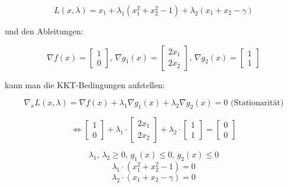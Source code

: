 \documentclass[a4paper, 12pt]{report}
\begin{document}
$$L(x, \lambda) = x_1 + \lambda_1(x_1^2 + x_2^2 - 1) + \lambda_2(x_1 + x_2 - \gamma)$$

und den Ableitungen:

$$\nabla f(x) = \begin{bmatrix}1 \\ 0\end{bmatrix} \text{, } \nabla g_1(x) = \begin{bmatrix}2x_1\\2x_2\end{bmatrix} \text{, } \nabla g_2(x) = \begin{bmatrix}1\\1\end{bmatrix}$$

kann man die KKT-Bedingungen aufstellen:

$$\nabla_x L(x, \lambda) = \nabla f(x) + \lambda_1\nabla g_1(x) + \lambda_2\nabla g_2(x) = 0 \text{ (Stationarität)}$$

$$ \Leftrightarrow \begin{bmatrix}1\\0\end{bmatrix} + \lambda_1\cdot \begin{bmatrix}2x_1\\2x_2\end{bmatrix} + \lambda_2\cdot \begin{bmatrix}1\\1\end{bmatrix} = \begin{bmatrix}0\\0\end{bmatrix}$$

$$\lambda_1\text{, } \lambda_2 \geq 0\text{, } g_1(x) \leq 0\text{, }g_2(x) \leq 0$$
$$\lambda_1\cdot (x_1^2 + x_2^2 - 1) = 0$$
$$\lambda_2\cdot (x_1 + x_2 - \gamma) = 0$$
\end{document}
